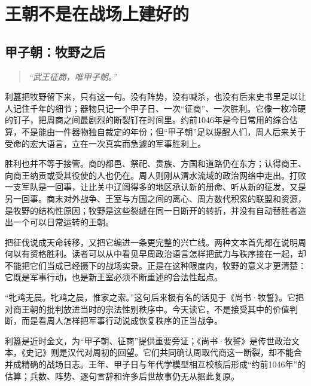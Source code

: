 \section{王朝不是在战场上建好的}

\subsection{甲子朝：牧野之后}


\begin{quote}
\centering\itshape “武王征商，唯甲子朝。”
\end{quote}

利簋把牧野留下来，只有这一句。没有阵势，没有喊杀，也没有后来史书里足以让人记住千年的细节；器物只记一个甲子日、一次“征商”、一次胜利。它像一枚冷硬的钉子，把周商之间最剧烈的断裂钉在时间里。约前1046年是今日常用的综合估算，不是能由一件器物独自裁定的年份；但“甲子朝”足以提醒人们，周人后来关于受命的宏大语言，立在一次真实而急遽的军事胜利上。

胜利也并不等于接管。商的都邑、祭祀、贵族、方国和道路仍在东方；认得商王、向商王纳贡或受其役使的人也仍在。周人则刚从渭水流域的政治网络中走出。打败一支军队是一回事，让比关中辽阔得多的地区承认新的册命、听从新的征发，又是另一回事。商末对外战争、王室与方国之间的离心、周方数代积累的联盟和资源，是牧野的结构性原因；牧野是这些裂缝在同一日断开的转折，并没有自动替胜者造出一个可以日常运转的王朝。



把征伐说成天命转移，又把它编进一条更完整的兴亡线。两种文本首先都在说明周何以有资格胜利。读者可以从中看见早周政治语言怎样把武力与秩序接在一起，却不能把它们当成已经摄下的战场实录。正是在这种限度内，牧野的意义才更清楚：它既是军事行动，也是新王室必须不断重述的合法性起点。

\begin{textwindow}[《尚书·牧誓》不是战地录音]
“牝鸡无晨。牝鸡之晨，惟家之索。”这句后来极有名的话见于《尚书·牧誓》。它把对商王朝的批判放进当时的宗法性别秩序中。今天读它，不是接受其中的价值判断，而是看周人怎样把军事行动说成恢复秩序的正当战争。
\end{textwindow}

\begin{sourcenote}[牧野能证实到哪里]
利簋是近时金文，为“甲子朝、征商”提供重要旁证；《尚书·牧誓》是传世政治文本，《史记》则是汉代对周初的回望。它们共同确认周取代商这一断裂，却不能合并成精确的战场日志。王年、甲子日与年代学模型相互校核后形成“约前1046年”的估算；兵数、阵势、逐句言辞和许多后世故事仍无从据此复原。
\end{sourcenote}

